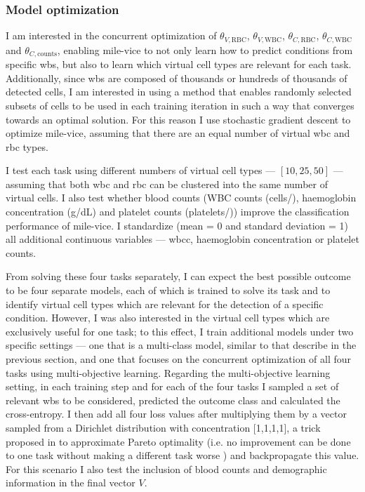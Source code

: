 \subsubsection{Model optimization}

I am interested in the concurrent optimization of $\theta_{V,\mathrm{RBC}}$, $\theta_{V,\mathrm{WBC}}$, $\theta_{C,\mathrm{RBC}}$, $\theta_{C,\mathrm{WBC}}$ and $\theta_{C,\mathrm{counts}}$, enabling \ac{mile-vice} to not only learn how to predict conditions from specific \ac{wbs}, but also to learn which virtual cell types are relevant for each task. Additionally, since \ac{wbs} are composed of thousands or hundreds of thousands of detected cells, I am interested in using a method that enables randomly selected subsets of cells to be used in each training iteration in such a way that converges towards an optimal solution. For this reason I use stochastic gradient descent to optimize \ac{mile-vice}, assuming that there are an equal number of virtual \ac{wbc} and \ac{rbc} types.

I test each task using different numbers of virtual cell types --- $[10, 25, 50]$ --- assuming that both \ac{wbc} and \ac{rbc} can be clustered into the same number of virtual cells. I also test whether blood counts (WBC counts (cells/\Mum), haemoglobin concentration (g/dL) and platelet counts (platelets/\Mum)) improve the classification performance of \ac{mile-vice}. I standardize (mean = 0 and standard deviation = 1) all additional continuous variables --- \ac{wbcc}, haemoglobin concentration or platelet counts. 

From solving these four tasks separately, I can expect the best possible outcome to be four separate models, each of which is trained to solve its task and to identify virtual cell types which are relevant for the detection of a specific condition. However, I was also interested in the virtual cell types which are exclusively useful for one task; to this effect, I train additional models under two specific settings --- one that is a multi-class model, similar to that describe in the previous section, and one that focuses on the concurrent optimization of all four tasks using multi-objective learning. Regarding the multi-objective learning setting, in each training step and for each of the four tasks I sampled a set of relevant \ac{wbs} to be considered, predicted the outcome class and calculated the cross-entropy. I then add all four loss values after multiplying them by a vector sampled from a Dirichlet distribution with concentration [1,1,1,1], a trick proposed in \cite{Ruchte2021-ch} to approximate Pareto optimality (i.e. no improvement can be done to one task without making a different task worse \cite{Censor1977-nd}) and backpropagate this value. For this scenario I also test the inclusion of blood counts and demographic information in the final vector $V$.

